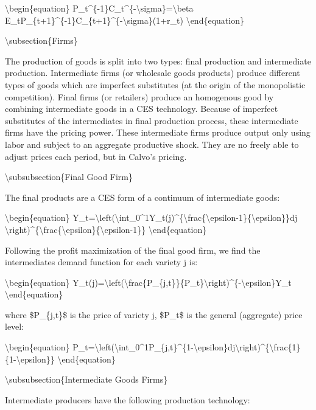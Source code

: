 \documentclass[10pt,math=newtx,citestyle=gb7714-2015,bibstyle=gb7714-2015]{elegantbook}
\begin{document}
	\textbackslash{}begin\{equation\}
	P\_t\^{}\{-1\}C\_t\^{}\{-\textbackslash{}sigma\}=\textbackslash{}beta E\_tP\_\{t+1\}\^{}\{-1\}C\_\{t+1\}\^{}\{-\textbackslash{}sigma\}(1+r\_t)
	\textbackslash{}end\{equation\}
	
	
	\textbackslash{}subsection\{Firms\}
	
	The production of goods is split into two types: final production and intermediate production. Intermediate firms (or wholesale goods products) produce different types of goods which are imperfect substitutes (at the origin of the monopolistic competition). Final firms (or retailers) produce an homogenous good by combining intermediate goods in a CES technology. Because of imperfect substitutes of the intermediates in final production process, these intermediate firms have the pricing power. These intermediate firms produce output only using labor and subject to an aggregate productive shock. They are no freely able to adjust prices each period, but in Calvo's pricing.
	
	\textbackslash{}subsubsection\{Final Good Firm\}
	
	The final products are a CES form of a continuum of intermediate goods:
	
	\textbackslash{}begin\{equation\}
	Y\_t=\textbackslash{}left(\textbackslash{}int\_0\^{}1Y\_t(j)\^{}\{\textbackslash{}frac\{\textbackslash{}epsilon-1\}\{\textbackslash{}epsilon\}\}dj \textbackslash{}right)\^{}\{\textbackslash{}frac\{\textbackslash{}epsilon\}\{\textbackslash{}epsilon-1\}\}
	\textbackslash{}end\{equation\}
	
	Following the profit maximization of the final good firm, we find the intermediates demand function for each variety j is:
	
	\textbackslash{}begin\{equation\}
	Y\_t(j)=\textbackslash{}left(\textbackslash{}frac\{P\_\{j,t\}\}\{P\_t\}\textbackslash{}right)\^{}\{-\textbackslash{}epsilon\}Y\_t
	\textbackslash{}end\{equation\}
	
	where \$P\_\{j,t\}\$ is the price of variety j, \$P\_t\$ is the general (aggregate) price level:
	
	\textbackslash{}begin\{equation\}
	P\_t=\textbackslash{}left(\textbackslash{}int\_0\^{}1P\_\{j,t\}\^{}\{1-\textbackslash{}epsilon\}dj\textbackslash{}right)\^{}\{\textbackslash{}frac\{1\}\{1-\textbackslash{}epsilon\}\}
	\textbackslash{}end\{equation\}
	
	\textbackslash{}subsubsection\{Intermediate Goods Firms\}
	
	Intermediate producers have the following production technology:
	
\end{document}
